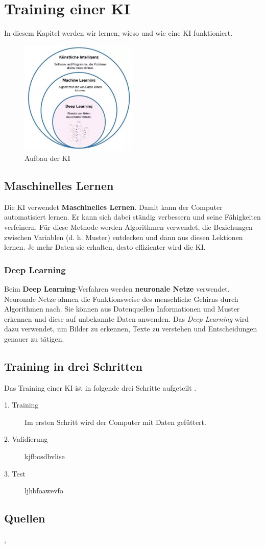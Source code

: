 \chapter{Training einer KI}
\label{chap:training}

In diesem Kapitel werden wir lernen, wieso und wie eine KI funktioniert.

\begin{figure}[h]
    \centering
    \includegraphics[width=0.5\textwidth]{ki-aufbau.jpg}
    \caption{Aufbau der KI}
    \label{fig:ki-aufbau}
\end{figure}

\section{Maschinelles Lernen}
Die KI verwendet \textbf{Maschinelles Lernen}. Damit kann der Computer automatisiert lernen. Er kann sich dabei ständig verbessern und seine Fähigkeiten verfeinern.
Für diese Methode werden Algorithmen verwendet, die Beziehungen zwischen Variablen (d. h. Muster) entdecken und dann aus diesen Lektionen lernen. Je mehr Daten sie erhalten, desto effizienter wird die KI.

\subsection{Deep Learning}
Beim \textbf{Deep Learning}-Verfahren werden \textbf{neuronale Netze} verwendet.
Neuronale Netze ahmen die Funktionsweise des menschliche Gehirns durch Algorithmen nach. Sie können aus Datenquellen Informationen und Muster erkennen und diese auf unbekannte Daten anwenden.
Das \textit{Deep Learning} wird dazu verwendet, um Bilder zu erkennen, Texte zu verstehen und Entscheidungen genauer zu tätigen.

\section{Training in drei Schritten}
Das Training einer KI ist in folgende drei Schritte aufgeteilt
.
\begin{description}
    \item[1. Training] Im ersten Schritt wird der Computer mit Daten gefüttert.
    \item[2. Validierung] kjfbosdbvlise
    \item[3. Test] ljhbfoawevfo
\end{description}

\bigskip

\section{Quellen} \citep{KI-Training}, \citep{neuronale-netze}